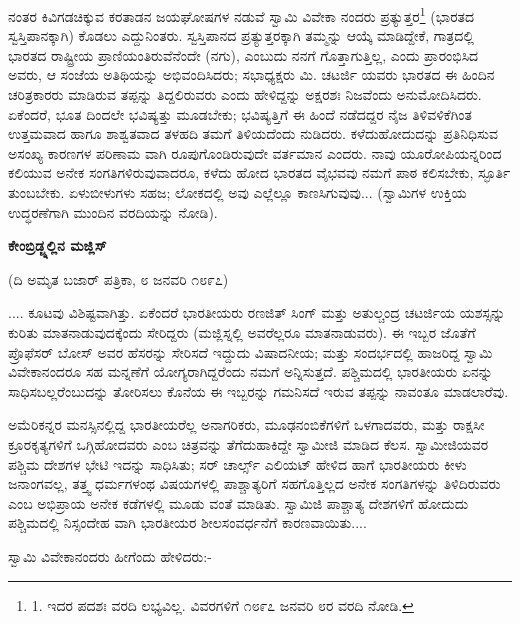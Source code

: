ನಂತರ ಕಿವಿಗಡಚಿಕ್ಕುವ ಕರತಾಡನ ಜಯಘೋಷಗಳ ನಡುವೆ ಸ್ವಾಮಿ ವಿವೇಕಾ ನಂದರು ಪ್ರತ್ಯುತ್ತರ\footnote{1. ಇದರ ಪದಶಃ ವರದಿ ಲಭ್ಯವಿಲ್ಲ. ವಿವರಗಳಿಗೆ  ೧೮೯೭ ಜನವರಿ ೮ರ  ವರದಿ ನೋಡಿ.} (ಭಾರತದ ಸ್ವಸ್ತಿಪಾನಕ್ಕಾಗಿ) ಕೊಡಲು ಎದ್ದುನಿಂತರು. ಸ್ವಸ್ತಿಪಾನದ ಪ್ರತ್ಯುತ್ತರಕ್ಕಾಗಿ ತಮ್ಮನ್ನು ಆಯ್ಕೆ ಮಾಡಿದ್ದೇಕೆ, ಗಾತ್ರದಲ್ಲಿ ಭಾರತದ ರಾಷ್ಟ್ರೀಯ ಪ್ರಾಣಿಯಂತಿರುವೆನೆಂದೇ (ನಗು), ಎಂಬುದು ನನಗೆ ಗೊತ್ತಾಗುತ್ತಿಲ್ಲ, ಎಂದು ಪ್ರಾರಂಭಿಸಿದ ಅವರು, ಆ ಸಂಜೆಯ ಅತಿಥಿಯನ್ನು ಅಭಿವಂದಿಸಿದರು; ಸಭಾಧ್ಯಕ್ಷರು ಮಿ. ಚಟರ್ಜಿ ಯವರು ಭಾರತದ ಈ ಹಿಂದಿನ ಚರಿತ್ರಕಾರರು ಮಾಡಿರುವ ತಪ್ಪನ್ನು ತಿದ್ದಲಿರುವರು ಎಂದು ಹೇಳಿದ್ದನ್ನು ಅಕ್ಷರಶಃ ನಿಜವೆಂದು ಅನುಮೋದಿಸಿದರು. ಏಕೆಂದರೆ, ಭೂತ ದಿಂದಲೇ ಭವಿಷ್ಯತ್ತು ಮೂಡಬೇಕು; ಭವಿಷ್ಯತ್ತಿಗೆ ಈ ಹಿಂದೆ ನಡೆದದ್ದರ ನೈಜ ತಿಳಿವಳಿಕೆಗಿಂತ ಉತ್ತಮವಾದ ಹಾಗೂ ಶಾಶ್ವತವಾದ ತಳಹದಿ ತಮಗೆ ತಿಳಿಯದೆಂದು ನುಡಿದರು. ಕಳೆದುಹೋದುದನ್ನು ಪ್ರತಿನಿಧಿಸುವ ಅಸಂಖ್ಯ ಕಾರಣಗಳ ಪರಿಣಾಮ ವಾಗಿ ರೂಪುಗೊಂಡಿರುವುದೇ ವರ್ತಮಾನ ಎಂದರು. ನಾವು ಯೂರೋಪಿಯನ್ನರಿಂದ ಕಲಿಯುವ ಅನೇಕ ಸಂಗತಿಗಳಿರುವುವಾದರೂ, ಕಳೆದು ಹೋದ ಭಾರತದ ವೈಭವವು ನಮಗೆ ಪಾಠ ಕಲಿಸಬೇಕು, ಸ್ಫೂರ್ತಿ ತುಂಬಬೇಕು. ಏಳುಬೀಳುಗಳು ಸಹಜ; ಲೋಕದಲ್ಲಿ ಅವು ಎಲ್ಲೆಲ್ಲೂ ಕಾಣಸಿಗುವುವು... (ಸ್ವಾಮಿಗಳ ಉಕ್ತಿಯ ಉದ್ಧರಣೆಗಾಗಿ ಮುಂದಿನ ವರದಿಯನ್ನು ನೋಡಿ).

\begin{center}
\textbf{ಕೇಂಬ್ರಿಡ್ಜ್ನಲ್ಲಿನ ಮಜ್ಲಿಸ್}
\end{center}

\begin{center}
(ದಿ ಅಮೃತ ಬಜಾರ್ ಪತ್ರಿಕಾ, ೮ ಜನವರಿ ೧೮೯೭)
\end{center}

.... ಕೂಟವು ವಿಶಿಷ್ಟವಾಗಿತ್ತು. ಏಕೆಂದರೆ ಭಾರತೀಯರು ರಣಜಿತ್ ಸಿಂಗ್ ಮತ್ತು ಅತುಲ್ಚಂದ್ರ ಚಟರ್ಜಿಯ ಯಶಸ್ಸನ್ನು ಕುರಿತು ಮಾತನಾಡುವುದಕ್ಕೆಂದು ಸೇರಿದ್ದರು (ಮಜ್ಲಿಸ್ನಲ್ಲಿ ಅವರೆಲ್ಲರೂ ಮಾತನಾಡುವರು). ಈ ಇಬ್ಬರ ಜೊತೆಗೆ ಪ್ರೊಫೆಸರ್ ಬೋಸ್ ಅವರ ಹೆಸರನ್ನು ಸೇರಿಸದೆ ಇದ್ದುದು ವಿಷಾದನೀಯ; ಮತ್ತು ಸಂದರ್ಭದಲ್ಲಿ ಹಾಜರಿದ್ದ ಸ್ವಾಮಿ ವಿವೇಕಾನಂದರೂ ಸಹ ಮನ್ನಣೆಗೆ ಯೋಗ್ಯರಾಗಿದ್ದರೆಂದು ನಮಗೆ ಅನ್ನಿಸುತ್ತದೆ. ಪಶ್ಚಿಮದಲ್ಲಿ ಭಾರತೀಯರು ಏನನ್ನು ಸಾಧಿಸಬಲ್ಲರೆಂಬುದನ್ನು ತೋರಿಸಲು ಕೊನೆಯ ಈ ಇಬ್ಬರನ್ನು ಗಮನಿಸದೆ ಇರುವ ತಪ್ಪನ್ನು ನಾವಂತೂ ಮಾಡಲಾರೆವು.

ಅಮೆರಿಕನ್ನರ ಮನಸ್ಸಿನಲ್ಲಿದ್ದ ಭಾರತೀಯರೆಲ್ಲ ಅನಾಗರಿಕರು, ಮೂಢನಂಬಿಕೆಗಳಿಗೆ ಒಳಗಾದವರು, ಮತ್ತು ರಾಕ್ಷಸೀ ಕ್ರೂರಕೃತ್ಯಗಳಿಗೆ ಒಗ್ಗಿಹೋದವರು ಎಂಬ ಚಿತ್ರವನ್ನು ತೆಗೆದುಹಾಕಿದ್ದೇ ಸ್ವಾಮೀಜಿ ಮಾಡಿದ ಕೆಲಸ. ಸ್ವಾಮೀಜಿಯವರ ಪಶ್ಚಿಮ ದೇಶಗಳ ಭೇಟಿ ಇದನ್ನು ಸಾಧಿಸಿತು; ಸರ್ ಚಾರ್ಲ್ಸ್ ಎಲಿಯಟ್ ಹೇಳಿದ ಹಾಗೆ ಭಾರತೀಯರು ಕೀಳು ಜನಾಂಗವಲ್ಲ, ತತ್ತ್ವ ಧರ್ಮಗಳಂಥ ವಿಷಯಗಳಲ್ಲಿ ಪಾಶ್ಚಾತ್ಯರಿಗೆ ಸಹಗೊತ್ತಿಲ್ಲದ ಅನೇಕ ಸಂಗತಿಗಳನ್ನು ತಿಳಿದಿರುವರು ಎಂಬ ಅಭಿಪ್ರಾಯ ಅನೇಕ ಕಡೆಗಳಲ್ಲಿ ಮೂಡು ವಂತೆ ಮಾಡಿತು. ಸ್ವಾಮಿಜಿ ಪಾಶ್ಚಾತ್ಯ ದೇಶಗಳಿಗೆ ಹೋದುದು ಪಶ್ಚಿಮದಲ್ಲಿ ನಿಸ್ಸಂದೇಹ ವಾಗಿ ಭಾರತೀಯರ ಶೀಲಸಂವರ್ಧನೆಗೆ ಕಾರಣವಾಯಿತು....

ಸ್ವಾಮಿ ವಿವೇಕಾನಂದರು ಹೀಗೆಂದು ಹೇಳಿದರು:-

